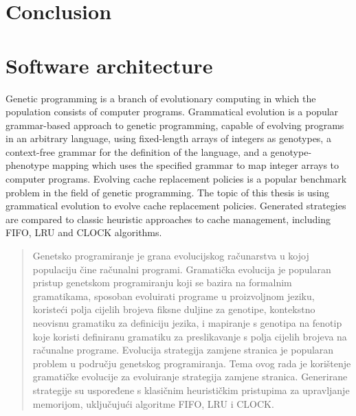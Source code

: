 \documentclass[times, utf8, zavrsni, numeric]{fer}
\begin{document}






\chapter{Conclusion}






\listoffigures

\appendix
\chapter{Software architecture}




\begin{sazetak}
Genetic programming is a branch of evolutionary computing in which the population consists of computer programs. Grammatical evolution is a popular grammar-based approach to genetic programming, capable of evolving programs in an arbitrary language, using fixed-length arrays of integers as genotypes, a context-free grammar for the definition of the language, and a genotype-phenotype mapping which uses the specified grammar to map integer arrays to computer programs. Evolving cache replacement policies is a popular benchmark problem in the field of genetic programming. The topic of this thesis is using grammatical evolution to evolve cache replacement policies. Generated strategies are compared to classic heuristic approaches to cache management, including  FIFO, LRU and CLOCK algorithms.

\end{sazetak}

\begin{abstract}
Genetsko programiranje je grana evolucijskog računarstva u kojoj populaciju čine računalni programi. Gramatička evolucija je popularan pristup genetskom programiranju koji se bazira na formalnim gramatikama, sposoban evoluirati programe u proizvoljnom jeziku, koristeći polja cijelih brojeva fiksne duljine za genotipe, kontekstno neovisnu gramatiku za definiciju jezika, i mapiranje s genotipa na fenotip koje koristi definiranu gramatiku za preslikavanje s polja cijelih brojeva na računalne programe. Evolucija strategija zamjene stranica je popularan problem u području genetskog programiranja. Tema ovog rada je korištenje gramatičke evolucije za evoluiranje strategija zamjene stranica. Generirane strategije su uspoređene s klasičnim heurističkim pristupima za upravljanje memorijom, uključujući algoritme FIFO, LRU i CLOCK.

\end{abstract}
\end{document}

